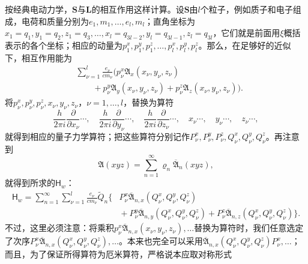 \documentclass[fontsize=13pt,twoside,openany,headings=normal,parskip=false,bookmarkpackage=false,DIV=calc]{scrbook}
\begin{document}
按经典电动力学，$\boldsymbol{S}$与$\boldsymbol{L}$的相互作用这样计算。设$\boldsymbol{S}$由$l$个粒子，例如质子和电子组成，电荷和质量分别为$e_1,\allowbreak m_1,\allowbreak \ldots,\allowbreak e_l,\allowbreak m_l$；直角坐标为$x_1=q_1,\allowbreak y_1=q_2,\allowbreak z_1=q_3,\allowbreak \ldots,\allowbreak x_l=q_{3l-2},\allowbreak y_l=q_{3l-1},\allowbreak z_l=q_{3l}$，它们就是前面用$\xi$概括表示的各个坐标；相应的动量为$p_1^x,\allowbreak p_1^y,\allowbreak p_1^z,\allowbreak \ldots,\allowbreak p_l^x,\allowbreak p_l^y,\allowbreak p_l^z$。那么，在足够好的近似下，相互作用能为
\begin{align*}
 &\sum_{\nu=1}^{l}\frac{e_\nu}{cm_\nu}
 \bigl(p_\nu^x\mathfrak A_x(x_\nu,y_\nu,z_\nu)\\
 &\qquad{}+p_\nu^y\mathfrak A_y(x_\nu,y_\nu,z_\nu)
 +p_\nu^z\mathfrak A_z(x_\nu,y_\nu,z_\nu)\bigr).
\end{align*}
将$p_\nu^x,\allowbreak p_\nu^y,\allowbreak p_\nu^z,\allowbreak x_\nu,\allowbreak y_\nu,\allowbreak z_\nu$，$\nu=1,\allowbreak \ldots,\allowbreak l$，替换为算符
\[
 \frac{h}{2\pi i}\frac{\partial}{\partial x_\nu}\cdots,\quad
 \frac{h}{2\pi i}\frac{\partial}{\partial y_\nu}\cdots,\quad
 \frac{h}{2\pi i}\frac{\partial}{\partial z_\nu}\cdots,\quad
 x_\nu\cdots,\quad y_\nu\cdots,\quad z_\nu\cdots,
\]
就得到相应的量子力学算符；把这些算符分别记作$P_\nu^x,\allowbreak P_\nu^y,\allowbreak P_\nu^z,\allowbreak Q_\nu^x,\allowbreak Q_\nu^y,\allowbreak Q_\nu^z$。再注意到
\[
 \mathfrak A(xyz)=\sum_{n=1}^{\infty}\varrho_n\overline{\mathfrak A}_n(xyz),
\]
就得到所求的$\mathsf{H}_w$：
\begin{align*}
 \mathsf{H}_w=\sum_{n=1}^{\infty}\sum_{\nu=1}^{l}\frac{e_\nu}{cm_\nu}\widetilde Q_n
 \bigl\{&P_\nu^x\overline{\mathfrak A}_{n,x}(Q_\nu^x,Q_\nu^y,Q_\nu^z)\\
 &{}+P_\nu^y\overline{\mathfrak A}_{n,y}(Q_\nu^x,Q_\nu^y,Q_\nu^z)
 +P_\nu^z\overline{\mathfrak A}_{n,z}(Q_\nu^x,Q_\nu^y,Q_\nu^z)\bigr\}.
\end{align*}
不过，这里必须注意：将乘积$p_\nu^x\overline{\mathfrak A}_{n,\allowbreak x}(x_\nu,\allowbreak y_\nu,\allowbreak z_\nu),\allowbreak \ldots$替换为算符时，我们任意选定了次序$P_\nu^x\overline{\mathfrak A}_{n,\allowbreak x}(Q_\nu^x,\allowbreak Q_\nu^y,\allowbreak Q_\nu^z),\allowbreak \ldots$。本来也完全可以采用$\overline{\mathfrak A}_{n,\allowbreak x}(Q_\nu^x,\allowbreak Q_\nu^y,\allowbreak Q_\nu^z)P_\nu^x,\allowbreak \ldots$；而且，为了保证所得算符为厄米算符，严格说本应取对称形式
\end{document}
